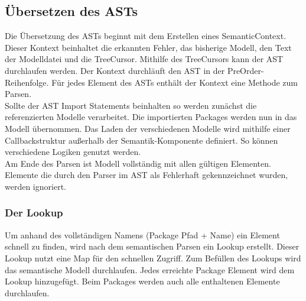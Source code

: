 \documentclass[./einleitung.tex]{subfiles}
\begin{document}
    \subsection{Übersetzen des ASTs}\label{subsec:ubersetzen-des-asts}
    Die Übersetzung des ASTs beginnt mit dem Erstellen eines SemanticContext.
    Dieser Kontext beinhaltet die erkannten Fehler, das bisherige Modell, den Text der Modelldatei und die TreeCursor.
    Mithilfe des TreeCursors kann der AST durchlaufen werden.
    Der Kontext durchläuft den AST in der PreOrder-Reihenfolge.
    Für jedes Element des ASTs enthält der Kontext eine Methode zum Parsen.\\
    Sollte der AST Import Statements beinhalten so werden zunächst die referenzierten Modelle verarbeitet.
    Die importierten Packages werden nun in das Modell übernommen.
    Das Laden der verschiedenen Modelle wird mithilfe einer Callbackstruktur außerhalb der Semantik-Komponente definiert.
    So können verschiedene Logiken genutzt werden. \\
    Am Ende des Parsen ist Modell vollständig mit allen gültigen Elementen.
    Elemente die durch den Parser im AST als Fehlerhaft gekennzeichnet wurden, werden ignoriert.

    \subsubsection{Der Lookup}
    Um anhand des vollständigen Namens (Package Pfad + Name) ein Element schnell zu finden, wird nach dem semantischen Parsen ein Lookup erstellt.
    Dieser Lookup nutzt eine Map für den schnellen Zugriff.
    Zum Befüllen des Lookups wird das semantische Modell durchlaufen.
    Jedes erreichte Package Element wird dem Lookup hinzugefügt.
    Beim Packages werden auch alle enthaltenen Elemente durchlaufen.
\end{document}
